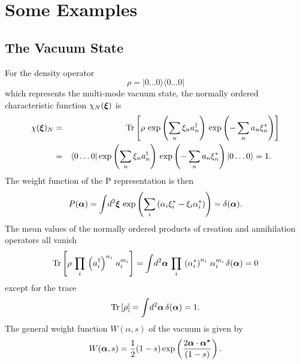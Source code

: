 \documentclass[12pt]{article}
\def\beq{\begin{equation}}
\def\eeq{\end{equation}}
\def\bea{\begin{eqnarray}}
\def\eea{\end{eqnarray}}
\def\a{\alpha}
\def\ba{{\mbox{\boldmath$\alpha$}}}
\def\bsa{{\mbox{\boldmath$\alpha^*$}}}
\def\sa{\alpha^*}
\def\d{\delta}
\def\x{\xi}
\def\bx{{\mbox{\boldmath$\xi$}}}
\def\xs{\xi^*}
\def\sx{\xi^*}
\def\nn{\nonumber}
\def\dgr{\dagger}
\def\Tr{{\rm Tr}}
\def\half{\frac{1}{2}}
\def\ops{operators }
\def\ani{annihilation }
\def\cre{creation }
\begin{document}
\section{Some Examples}
\subsection{The Vacuum State}
For the density operator 
\beq
\rho = | 0 \dots 0 \rangle \langle 0 \dots 0 |
\label {vac}
\eeq
which represents the multi-mode vacuum state,
the normally ordered characteristic function
$ \chi_N( \bx ) $ is
\bea
\chi( \bx )_N & = & \Tr \left[ \rho
\, \exp\left( \sum_n \x_n a^\dgr_n \right)
\, \exp\left( - \sum_n a_n \xs_n \right)
\right] \nn\\
& = & \langle 0 \dots 0 | \exp\left( \sum_n \x_n a^\dgr_n \right)
\, \exp\left( - \sum_n a_n \xs_n \right) | 0 \dots 0 \rangle
= 1 . \quad
\label {vax}
\eea
The weight function of the P representation is then
\beq
P( \ba ) = \int \! d^2\bx \, \exp 
\left( \sum_i \left( \a_i \sx_i - \x_i \sa_i \right) \right)
= \d( \ba ) .
\label {pax}
\eeq
The mean values of the normally ordered products
of \cre and \ani \ops all vanish 
\beq
\Tr \left[
\rho \, \prod_i \,
\left( a^\dgr_i \right)^{n_i} \, a_i^{ m_i } \right]
= \int \! d^2 \ba \, \prod_i \,
\left( \sa_i \right)^{n_i} \, \a_i^{ m_i } \, 
\d( \ba ) = 0
\label {0}
\eeq
except for the trace
\beq
\Tr \left[ \rho  \right] =
\int \! d^2 \ba \, \d( \ba ) = 1 .
\label {Tr1}
\eeq
The general weight function $ W( \a , s) $
of the vacuum is given by 
\beq
W( \ba , s) = 
\half ( 1 - s ) \exp \left( \frac {2 \ba \cdot \bsa }{ (1 - s ) } \right) .
\eeq
 
\end{document}
